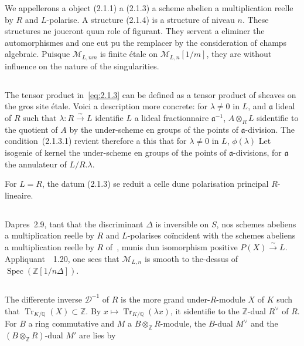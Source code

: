 \documentclass[11pt,a4paper]{article}
\theoremstyle{plain}
\theoremstyle{definition}
\DeclareMathOperator{\Spec}{Spec}
\DeclareMathOperator{\Tr}{Tr}
\begin{document}
We appellerons a object (2.1.1) a (2.1.3) a scheme abelien a multiplication
reelle by $R$ and $L$-polarise. A structure (2.1.4) is a structure of niveau
$n$. These structures ne joueront quun role of figurant. They servent a eliminer the
automorphismes and one eut pu the remplacer by the consideration of champs
algebraic. Puisque $\mathscr{M}_{L,nm}$ is finite étale on $\mathscr{M}_{L,n}[1/m]$, they are without influence
on the nature of the singularities.

\subsection{}

The tensor product in~\eqref{eq:2.1.3} can be defined as a tensor product of sheaves on the gros site étale. Voici a description more concrete:
for $\lambda \neq 0$ in $L$, and $\mathfrak{a}$ lideal of $R$ such that $\lambda: R \xrightarrow{\sim} L$ identifie $L$ a lideal
fractionnaire $\mathfrak{a}^{-1}$, $A \otimes_R L$ sidentifie to the quotient of $A$ by the under-scheme en
groups of the points of $\mathfrak{a}$-division. The condition~(2.1.3.1) revient therefore a this that
for $\lambda \neq 0$ in $L$, $\phi(\lambda)$ Let isogenie of kernel the under-scheme en
groups of the points of $\mathfrak{a}$-divisions, for $\mathfrak{a}$ the annulateur of $L/R.\lambda$.

For $L = R$, the datum (2.1.3) se reduit a celle dune polarisation principal
$R$-lineaire.

\subsection{}

Dapres~2.9, tant that the discriminant $\Delta$ is inversible on $S$, nos schemes
abeliens a multiplication reelle by $R$ and $L$-polarises co\"{i}ncident with the schemes
abeliens a multiplication reelle by $R$ of~\cite{Rapoport}, munis dun isomorphism
positive $P(X) \xrightarrow{\sim} L$. Appliquant~\cite{Rapoport}~1.20, one sees that $\mathscr{M}_{L,n}$ is smooth to the-dessus of
$\Spec(\mathbb{Z}[1/n\Delta])$.

\subsection{}

The differente inverse $\mathscr{D}^{-1}$ of $R$ is the more grand under-$R$-module $X$ of $K$
such that $\Tr_{K/\mathbb{Q}}(X) \subset \mathbb{Z}$. By $x \mapsto \Tr_{K/\mathbb{Q}}(\lambda x)$, it sidentifie to the $\mathbb{Z}$-dual $R^\vee$ of $R$.
For $B$ a ring commutative and $M$ a $B \otimes_{\mathbb{Z}} R$-module, the $B$-dual $M^\vee$ and the
$(B \otimes_{\mathbb{Z}} R)$-dual $M'$ are lies by
\end{document}
